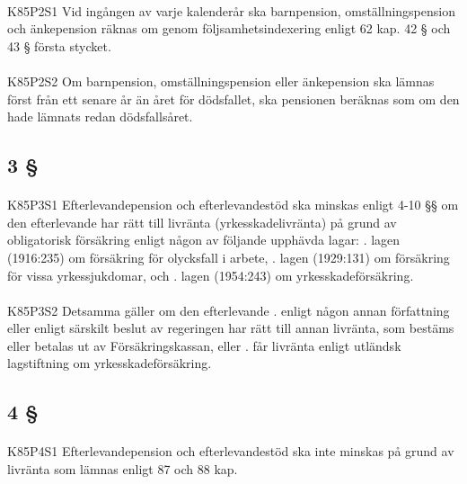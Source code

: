 \documentclass[a4paper,notitlepage,openany,10pt]{book}
\begin{document}
\paragraph*{}
{\tiny K85P2S1}
Vid ingången av varje kalenderår ska barnpension, omställningspension och änkepension räknas om genom följsamhetsindexering enligt 62 kap. 42 § och 43 § första stycket.
\paragraph*{}
{\tiny K85P2S2}
Om barnpension, omställningspension eller änkepension ska lämnas först från ett senare år än året för dödsfallet, ska pensionen beräknas som om den hade lämnats redan dödsfallsåret.
\subsection*{3 §}
\paragraph*{}
{\tiny K85P3S1}
Efterlevandepension och efterlevandestöd ska minskas enligt 4-10 §§ om den efterlevande har rätt till livränta (yrkesskadelivränta) på grund av obligatorisk försäkring enligt någon av följande upphävda lagar:
. lagen (1916:235) om försäkring för olycksfall i arbete,
. lagen (1929:131) om försäkring för vissa yrkessjukdomar, och
. lagen (1954:243) om yrkesskadeförsäkring.
\paragraph*{}
{\tiny K85P3S2}
Detsamma gäller om den efterlevande
. enligt någon annan författning eller enligt särskilt beslut av regeringen har rätt till annan livränta, som bestäms eller betalas ut av Försäkringskassan, eller
. får livränta enligt utländsk lagstiftning om yrkesskadeförsäkring.
\subsection*{4 §}
\paragraph*{}
{\tiny K85P4S1}
Efterlevandepension och efterlevandestöd ska inte minskas på grund av livränta som lämnas enligt 87 och 88 kap.
\end{document}
